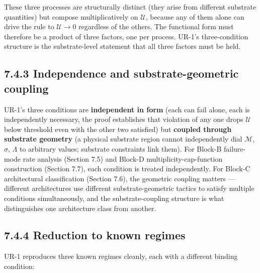 \documentclass[11pt]{book}
\begin{document}
These three processes are structurally distinct (they arise from different substrate quantities) but compose multiplicatively on $\mathcal{U}$, because any of them alone can drive the rule to $\mathcal{U} \to 0$ regardless of the others. The functional form must therefore be a product of three factors, one per process. UR-1's three-condition structure is the substrate-level statement that all three factors must be held.

\subsection{7.4.3 Independence and substrate-geometric coupling}

UR-1's three conditions are \textbf{independent in form} (each can fail alone, each is independently necessary, the proof establishes that violation of any one drops $\mathcal{U}$ below threshold even with the other two satisfied) but \textbf{coupled through substrate geometry} (a physical substrate region cannot independently dial $\mathcal{M}$, $\sigma$, $\Lambda$ to arbitrary values; substrate constraints link them). For Block-B failure-mode rate analysis (Section 7.5) and Block-D multiplicity-cap-function construction (Section 7.7), each condition is treated independently. For Block-C architectural classification (Section 7.6), the geometric coupling matters — different architectures use different substrate-geometric tactics to satisfy multiple conditions simultaneously, and the substrate-coupling structure is what distinguishes one architecture class from another.

\subsection{7.4.4 Reduction to known regimes}

UR-1 reproduces three known regimes cleanly, each with a different binding condition:
\end{document}
